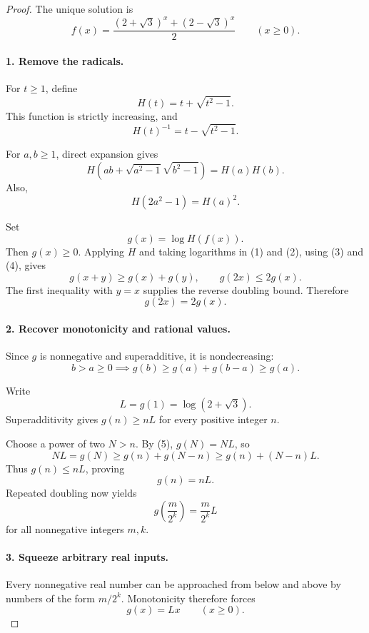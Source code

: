 
\begin{dlsummary}[title={\bfseries Solution 45. The Conjugate-Radical Lock},breakable]

\begin{proof}
The unique solution is
\[
\boxed{
f(x)=\frac{(2+\sqrt3)^x+(2-\sqrt3)^x}{2}
\qquad(x\ge0).
}
\]

\paragraph{1. Remove the radicals.}

For \(t\ge1\), define
\[
H(t)=t+\sqrt{t^2-1}.
\]
This function is strictly increasing, and
\[
H(t)^{-1}=t-\sqrt{t^2-1}.
\]

For \(a,b\ge1\), direct expansion gives
\[
H\!\left(ab+\sqrt{a^2-1}\sqrt{b^2-1}\right)=H(a)H(b).
\tag{3}
\]
Also,
\[
H(2a^2-1)=H(a)^2. \tag{4}
\]

Set
\[
g(x)=\log H(f(x)).
\]
Then \(g(x)\ge0\). Applying \(H\) and taking logarithms in (1) and (2), using (3) and (4), gives
\[
g(x+y)\ge g(x)+g(y),
\qquad
g(2x)\le2g(x).
\]
The first inequality with \(y=x\) supplies the reverse doubling bound. Therefore
\[
\boxed{g(2x)=2g(x).} \tag{5}
\]

\paragraph{2. Recover monotonicity and rational values.}

Since \(g\) is nonnegative and superadditive, it is nondecreasing:
\[
b>a\ge0
\implies
g(b)\ge g(a)+g(b-a)\ge g(a).
\]

Write
\[
L=g(1)=\log(2+\sqrt3).
\]
Superadditivity gives \(g(n)\ge nL\) for every positive integer \(n\).

Choose a power of two \(N>n\). By (5), \(g(N)=NL\), so
\[
NL=g(N)\ge g(n)+g(N-n)\ge g(n)+(N-n)L.
\]
Thus \(g(n)\le nL\), proving
\[
g(n)=nL.
\]
Repeated doubling now yields
\[
g\!\left(\frac{m}{2^k}\right)=\frac{m}{2^k}L
\]
for all nonnegative integers \(m,k\).

\paragraph{3. Squeeze arbitrary real inputs.}

Every nonnegative real number can be approached from below and above by numbers of the form \(m/2^k\). Monotonicity therefore forces
\[
g(x)=Lx\qquad(x\ge0).
\]


\end{proof}
\end{dlsummary}
